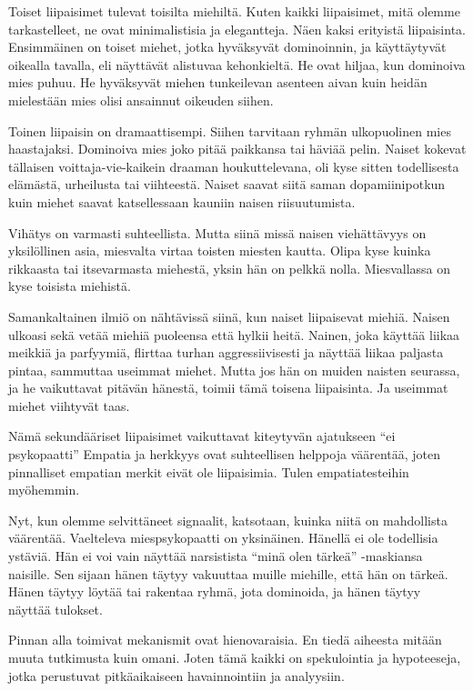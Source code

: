 Toiset liipaisimet tulevat toisilta miehiltä. Kuten kaikki liipaisimet, mitä olemme tarkastelleet, ne ovat minimalistisia ja elegantteja. Näen kaksi erityistä liipaisinta. Ensimmäinen on toiset miehet, jotka hyväksyvät dominoinnin, ja käyttäytyvät oikealla tavalla, eli näyttävät alistuvaa kehonkieltä. He ovat hiljaa, kun dominoiva mies puhuu. He hyväksyvät miehen tunkeilevan asenteen aivan kuin heidän mielestään mies olisi ansainnut oikeuden siihen.

Toinen liipaisin on dramaattisempi. Siihen tarvitaan ryhmän ulkopuolinen mies haastajaksi. Dominoiva mies joko pitää paikkansa tai häviää pelin. Naiset kokevat tällaisen voittaja-vie-kaikein draaman houkuttelevana, oli kyse sitten todellisesta elämästä, urheilusta tai viihteestä. Naiset saavat siitä saman dopamiinipotkun kuin miehet saavat katsellessaan kauniin naisen riisuutumista.

Vihätys on varmasti suhteellista. Mutta siinä missä naisen viehättävyys on yksilöllinen asia, miesvalta virtaa toisten miesten kautta. Olipa kyse kuinka rikkaasta tai itsevarmasta miehestä, yksin hän on pelkkä nolla. Miesvallassa on kyse toisista miehistä.

Samankaltainen ilmiö on nähtävissä siinä, kun naiset liipaisevat miehiä. Naisen ulkoasi sekä vetää miehiä puoleensa että hylkii heitä. Nainen, joka käyttää liikaa meikkiä ja parfyymiä, flirttaa turhan aggressiivisesti ja näyttää liikaa paljasta pintaa, sammuttaa useimmat miehet. Mutta jos hän on muiden naisten seurassa, ja he vaikuttavat pitävän hänestä, toimii tämä toisena liipaisinta. Ja useimmat miehet viihtyvät taas.

Nämä sekundääriset liipaisimet vaikuttavat kiteytyvän ajatukseen ``ei psykopaatti'' Empatia ja herkkyys ovat suhteellisen helppoja väärentää, joten pinnalliset empatian merkit eivät ole liipaisimia. Tulen empatiatesteihin myöhemmin.

Nyt, kun olemme selvittäneet signaalit, katsotaan, kuinka niitä on mahdollista väärentää. Vaelteleva miespsykopaatti on yksinäinen. Hänellä ei ole todellisia ystäviä. Hän ei voi vain näyttää narsistista ``minä olen tärkeä'' -maskiansa naisille. Sen sijaan hänen täytyy vakuuttaa muille miehille, että hän on tärkeä. Hänen täytyy löytää tai rakentaa ryhmä, jota dominoida, ja hänen täytyy näyttää tulokset.

Pinnan alla toimivat mekanismit ovat hienovaraisia. En tiedä aiheesta mitään muuta tutkimusta kuin omani. Joten tämä kaikki on spekulointia ja hypoteeseja, jotka perustuvat pitkäaikaiseen havainnointiin ja analyysiin.

